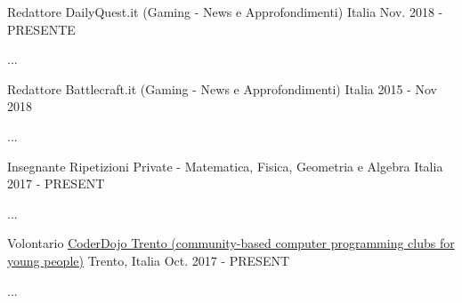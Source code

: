 

\begin{cventries}

  \cventry
    {Redattore} %
    {DailyQuest.it (Gaming - News e Approfondimenti)} %
    {Italia} %
    {Nov. 2018 - PRESENTE} %
    {
      \begin{cvitems} %
        \item {...}
      \end{cvitems}
    }

  \cventry
    {Redattore} %
    {Battlecraft.it (Gaming - News e Approfondimenti)} %
    {Italia} %
    {2015 - Nov 2018} %
    {
      \begin{cvitems} %
        \item {...}
      \end{cvitems}
    }

  \cventry
    {Insegnante} %
    {Ripetizioni Private - Matematica, Fisica, Geometria e Algebra} %
    {Italia} %
    {2017 - PRESENT} %
    {
      \begin{cvitems} %
        \item {...}
      \end{cvitems}
    }

  \cventry
    {Volontario} %
    {\href{https://www.coderdojotrento.it/}{CoderDojo Trento (community-based computer programming clubs for young people)}} %
    {Trento, Italia} %
    {Oct. 2017 - PRESENT} %
    {
      \begin{cvitems} %
        \item {...}
      \end{cvitems}
    }


\end{cventries}
